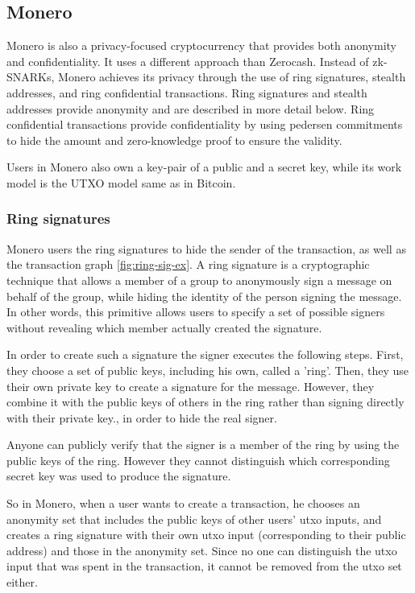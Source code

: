 \subsection{Monero}

Monero \cite{Monero} is also a privacy-focused cryptocurrency that provides both anonymity and confidentiality. It uses a different approach than Zerocash. Instead of zk-SNARKs, Monero achieves its privacy through the use of ring signatures, stealth addresses, and ring confidential transactions. 
Ring signatures and stealth addresses provide anonymity and are described in more detail below.
Ring confidential transactions provide confidentiality by using pedersen commitments to hide the amount and zero-knowledge proof to ensure the validity.

Users in Monero also own a key-pair of a public and a secret key, while its work model is the UTXO model same as in Bitcoin.

\subsubsection{Ring signatures}
Monero users the ring signatures \cite{Rivest2006} to hide the sender of the transaction, as well as the transaction graph \autoref{fig:ring-sig-ex}. A ring signature is a cryptographic technique that allows a member of a group to anonymously sign a message on behalf of the group, while hiding the identity of the person signing the message. In other words, this primitive allows users to specify a set of possible signers without revealing which member actually created the signature.

In order to create such a signature the signer executes the following steps. First, they choose a set of public keys, including his own, called a 'ring'. Then, they use their own private key to create a signature for the message. However, they combine it with the public keys of others in the ring rather than signing directly with their private key., in order to hide the real signer.

Anyone can publicly verify that the signer is a member of the ring by using the public keys of the ring. However they cannot distinguish which corresponding secret key was used to produce the signature.

So in Monero, when a user wants to create a transaction, he chooses an anonymity set that includes the public keys of other users' utxo inputs, and creates a ring signature with their own utxo input (corresponding to their public address) and those in the anonymity set.
Since no one can distinguish the utxo input that was spent in the transaction, it cannot be removed from the utxo set either.

